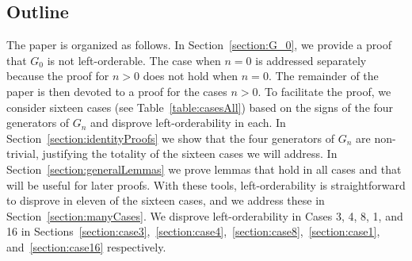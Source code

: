 








\subsection{Outline}
The paper is organized as follows. In Section~\ref{section:G_0}, we provide a proof that $G_0$ is not left-orderable. The case when $n=0$ is addressed separately because the proof for $n>0$ does not hold when $n=0$. The remainder of the paper is then devoted to a proof for the cases $n>0$. To facilitate the proof, we consider sixteen cases (see Table~\ref{table:casesAll}) based on the signs of the four generators of $G_n$ and disprove left-orderability in each. In Section~\ref{section:identityProofs} we show that the four generators of $G_n$ are non-trivial, justifying the totality of the sixteen cases we will address. In Section~\ref{section:generalLemmas} we prove lemmas that hold in all cases and that will be useful for later proofs. With these tools, left-orderability is straightforward to disprove in eleven of the sixteen cases, and we address these in Section~\ref{section:manyCases}. We disprove left-orderability in Cases 3, 4, 8, 1, and 16  in Sections~\ref{section:case3},~\ref{section:case4},~\ref{section:case8},~\ref{section:case1}, and~\ref{section:case16} respectively.

